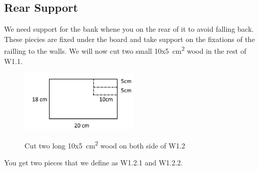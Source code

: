 \documentclass{subfiles}
\begin{document}
    \subsection*{Rear Support}
    We need support for the bank whene you on the rear of it to avoid falling back. 
    These piecies are fixed under the board and take support on the fixations of the railling to the walls. 
    We will now cut two small 10x5\SI{}{\square\centi\meter} wood in the rest of W1.1.
    \begin{figure}[h]
        \centering
        \includegraphics[width=0.5\textwidth]{Ressources/Cut_W1_2.png}
        \label{fig:Cut_W1_2}
        \caption{Cut two long 10x5\SI{}{\square\centi\meter} wood on both side of W1.2}
    \end{figure}
    You get two pieces that we define as W1.2.1 and W1.2.2.
\end{document}
